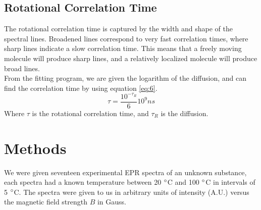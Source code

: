 \documentclass[twocolumn]{article}
\begin{document}
\subsection{Rotational Correlation Time}
The rotational correlation time is captured by the width and shape of the spectral lines. Broadened lines correspond to very fast correlation times, where sharp lines indicate a slow correlation time. This means that a freely moving molecule will produce sharp lines, and a relatively localized molecule will produce broad lines. \\
\indent
From the fitting program, we are given the logarithm of the diffusion, and can find the correlation time by using equation \ref{eq:6}.
\begin{equation}
\tau = \frac{10^{-\tau_{R}}}{6}10^9\si{ns}
\label{eq:6}
\end{equation}
Where $\tau$ is the rotational correlation time, and $\tau_{R}$ is the diffusion. 
\section{Methods}
\label{sec:methods}
We were given seventeen experimental EPR spectra of an unknown substance, each spectra had a known temperature between 20 $\degree$C and 100 $\degree$C in intervals of 5 $\degree$C. The spectra were given to us in arbitrary units of intensity (A.U.) versus the magnetic field strength $B$ in Gauss. \\
\end{document}
